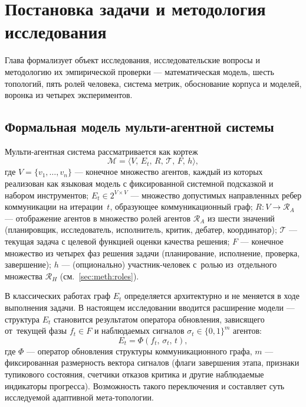 
\section{Постановка задачи и методология исследования}
\label{sec:methodology}

Глава формализует объект исследования, исследовательские вопросы
и методологию их эмпирической проверки --- математическая модель,
шесть топологий, пять ролей человека, система метрик, обоснование
корпуса и моделей, воронка из четырех экспериментов.

\subsection{Формальная модель мульти-агентной системы}
\label{sec:meth:formal}

Мульти-агентная система рассматривается как кортеж
\begin{equation}
\mathcal{M} = \langle V,\, E_t,\, R,\, \mathcal{T},\, F,\, h \rangle,
\end{equation}
где $V = \{v_1, \dots, v_n\}$ --- конечное множество агентов,
каждый из которых реализован как языковая модель с фиксированной
системной подсказкой и набором инструментов; $E_t \in 2^{V \times V}$
--- множество допустимых направленных ребер коммуникации на
итерации~$t$, образующее коммуникационный граф; $R \colon V \to
\mathcal{R}_A$ --- отображение агентов в множество ролей агентов
$\mathcal{R}_A$ из шести значений (планировщик, исследователь,
исполнитель, критик, дебатер, координатор); $\mathcal{T}$ ---
текущая задача с целевой функцией оценки качества решения;
$F$ --- конечное множество из четырех фаз решения задачи
(планирование, исполнение, проверка, завершение); $h$ ---
(опционально) участник-человек с~ролью из~отдельного множества
$\mathcal{R}_H$ (см.~\ref{sec:meth:roles}).

В классических работах граф $E_t$ определяется архитектурно и не
меняется в ходе выполнения задачи. В настоящем исследовании
вводится расширение модели --- структура $E_t$ становится результатом
оператора обновления, зависящего от~текущей фазы $f_t \in F$ и
наблюдаемых сигналов $\sigma_t \in \{0,1\}^m$ агентов:
\begin{equation}
E_t = \Phi(f_t,\, \sigma_t,\, t),
\label{eq:meth:adaptive}
\end{equation}
где $\Phi$ --- оператор обновления структуры коммуникационного
графа, $m$ --- фиксированная размерность вектора сигналов
(флаги завершения этапа, признаки тупикового состояния, счетчики
отказов критика и другие наблюдаемые индикаторы прогресса).
Возможность такого переключения и составляет суть исследуемой
адаптивной мета-топологии.

